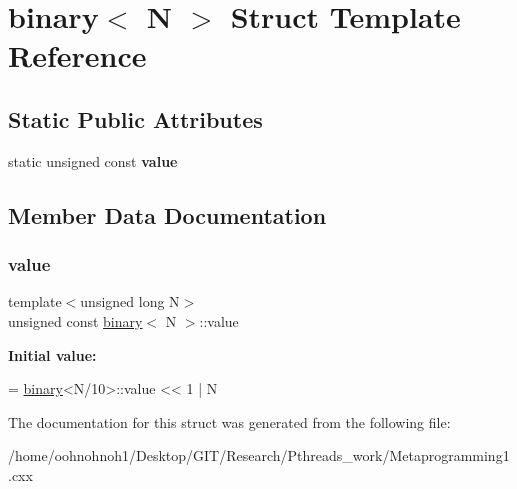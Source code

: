 \hypertarget{structbinary}{}\section{binary$<$ N $>$ Struct Template Reference}
\label{structbinary}
\subsection*{Static Public Attributes}
\begin{DoxyCompactItemize}
\item 
static unsigned const {\bfseries value}
\end{DoxyCompactItemize}


\subsection{Member Data Documentation}
\mbox{\label{structbinary_a945f31f5adc56b48f3ded51940ec75b3}} 
\subsubsection{\texorpdfstring{value}{value}}
{\footnotesize\ttfamily template$<$unsigned long N$>$ \\
unsigned const \hyperlink{structbinary}{binary}$<$ N $>$\+::value\hspace{0.3cm}{\ttfamily [static]}}

{\bfseries Initial value\+:}
\begin{DoxyCode}
= \hyperlink{structbinary}{binary}<N/10>::value << 1 
               | N%
\end{DoxyCode}


The documentation for this struct was generated from the following file\+:\begin{DoxyCompactItemize}
\item 
/home/oohnohnoh1/\+Desktop/\+G\+I\+T/\+Research/\+Pthreads\+\_\+work/Metaprogramming1.\+cxx\end{DoxyCompactItemize}
